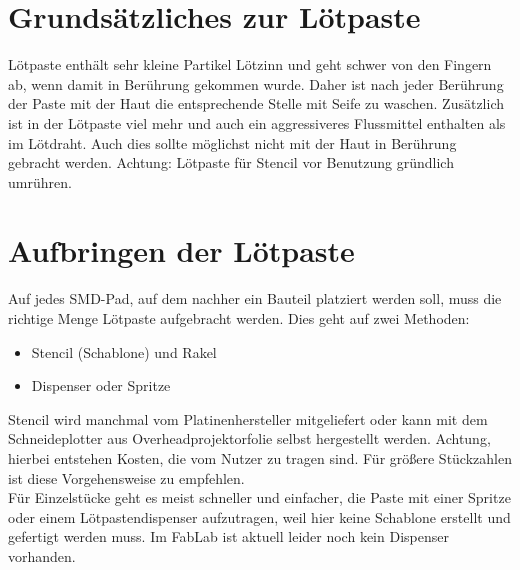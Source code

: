 \documentclass{\basedir/fablab-document}
\begin{document}


\newpage
\renewcommand{\contentsname}{Inhaltsverzeichnis / Arbeitsablauf}
\setcounter{tocdepth}{2}
\tableofcontents
\newpage

\section{Grundsätzliches zur Lötpaste}
Lötpaste enthält sehr kleine Partikel Lötzinn und geht schwer von den Fingern ab, wenn damit in Berührung gekommen wurde. Daher ist nach jeder Berührung der Paste mit der Haut die entsprechende Stelle mit Seife zu waschen. Zusätzlich ist in der Lötpaste viel mehr und auch ein aggressiveres Flussmittel enthalten als im Lötdraht. Auch dies sollte möglichst nicht mit der Haut in Berührung gebracht werden. Achtung: Lötpaste für Stencil vor Benutzung gründlich umrühren.

\section{Aufbringen der Lötpaste}
Auf jedes SMD-Pad, auf dem nachher ein Bauteil platziert werden soll, muss die richtige Menge Lötpaste aufgebracht werden. Dies geht auf zwei Methoden:
\begin{itemize}
	\item Stencil (Schablone) und Rakel
	\item Dispenser oder Spritze
\end{itemize}
Stencil wird manchmal vom Platinenhersteller mitgeliefert oder kann mit dem Schneideplotter aus Overheadprojektorfolie selbst hergestellt werden. Achtung, hierbei entstehen Kosten, die vom Nutzer zu tragen sind. Für größere Stückzahlen ist diese Vorgehensweise zu empfehlen.\\
Für Einzelstücke geht es meist schneller und einfacher, die Paste mit einer Spritze oder einem Lötpastendispenser aufzutragen, weil hier keine Schablone erstellt und gefertigt werden muss. Im FabLab ist aktuell leider noch kein Dispenser vorhanden.
\end{document}
